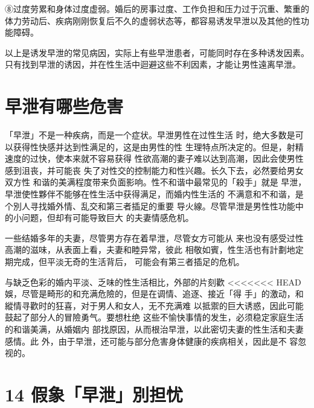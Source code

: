 \documentclass[12pt,UTF8]{ctexbook}
\begin{document}
⑧过度劳累和身体过度虚弱。婚后的房事过度、工作负担和压力过于沉重、繁重的体力劳动后、疾病刚刚恢复后不久的虚弱状态等，都容易诱发早泄以及其他的性功能障碍。

以上是诱发早泄的常见病因，实际上有些早泄患者，可能同时存在多种诱发因素。只有找到早泄的诱因，并在性生活中迴避这些不利因素，才能让男性遠离早泄。

\section{早泄有哪些危害}

「早泄」不是一种疾病，而是一个症状。早泄男性在过性生活
时，绝大多数是可以获得性快感并达到性满足的，这是由男性的性
生理特点所决定的。但是，射精速度的过快，使本来就不容易获得
性欲高潮的妻子难以达到高潮，因此会使男性感到沮丧，并可能丧
失了对性交的控制能力和性兴趣。长久下去，必然要给男女双方性
和谐的美满程度带来负面影响。性不和谐中最常见的「殺手」就是
早泄，早泄使性夥伴不能够在性生活中获得满足，而婚内性生活的
不满意和不和谐，是个別人寻找婚外情、乱交和第三者插足的重要
导火線。尽管早泄是男性性功能中的小问题，但却有可能导致巨大
的夫妻情感危机。

一些结婚多年的夫妻，尽管男方存在着早泄，尽管女方可能从
来也没有感受过性高潮的滋味，从表面上看，夫妻和睦异常，彼此
相敬如賓，性生活也有計劃地定期完成，但平淡无奇的生活背后，
可能会有第三者插足的危机。

与缺乏色彩的婚内平淡、乏味的性生活相比，外部的片刻歡
<<<<<<< HEAD
娛，尽管是畸形的和充满危險的，但是在调情、追逐、接近「得
手」的激动，和縱情寻歡时的狂喜，对于男人和女人，无不充满难
以抵禦的巨大诱惑，因此可能鼓起了部分人的冒險勇气。要想杜绝
这些不愉快事情的发生，必须稳定家庭生活的和谐美满，从婚姻内
部找原因，从而根治早泄，以此密切夫妻的性生活和夫妻感情。此
外，由于早泄，还可能与部分危害身体健康的疾病相关，因此是不
容忽视的。

\section{14 假象「早泄」別担忧}
\end{document}

